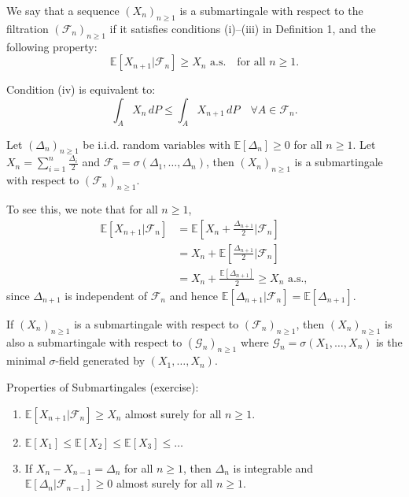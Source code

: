 \begin{definition}
We say that a sequence $(X_n)_{n\geq1}$ is a submartingale with respect to the filtration $(\mathcal{F}_n)_{n\geq1}$ if it satisfies conditions (i)--(iii) in Definition 1, and the following property:
\begin{equation*}
    \mathbb{E}[X_{n+1}|\mathcal{F}_n] \geq X_n \text{ a.s.} \quad \text{for all } n \geq 1.
\end{equation*}
\end{definition}

Condition (iv) is equivalent to:
\begin{equation*}
    \int_A X_n \, dP \leq \int_A X_{n+1} \, dP \quad \forall A \in \mathcal{F}_n.
\end{equation*}


\begin{example}
Let $(\Delta_n)_{n\geq1}$ be i.i.d. random variables with $\mathbb{E}[\Delta_n] \geq 0$ for all $n \geq 1$. Let $X_n = \sum_{i=1}^n \frac{\Delta_i}{2}$ and $\mathcal{F}_n = \sigma(\Delta_1, \ldots, \Delta_n)$, then $(X_n)_{n\geq1}$ is a submartingale with respect to $(\mathcal{F}_n)_{n\geq1}$.

To see this, we note that for all $n \geq 1$,
\begin{align*}
    \mathbb{E}[X_{n+1}|\mathcal{F}_n] &= \mathbb{E}[X_n + \frac{\Delta_{n+1}}{2}|\mathcal{F}_n] \\
    &= X_n + \mathbb{E}[\frac{\Delta_{n+1}}{2}|\mathcal{F}_n] \\
    &= X_n + \frac{\mathbb{E}[\Delta_{n+1}]}{2} \geq X_n \text{ a.s.},
\end{align*}
since $\Delta_{n+1}$ is independent of $\mathcal{F}_n$ and hence $\mathbb{E}[\Delta_{n+1}|\mathcal{F}_n] = \mathbb{E}[\Delta_{n+1}]$.
\end{example}

If $(X_n)_{n \geq 1}$ is a submartingale with respect to $(\mathcal{F}_n)_{n \geq 1}$, then $(X_n)_{n \geq 1}$ is also a submartingale with respect to $(\mathcal{G}_n)_{n \geq 1}$ where $\mathcal{G}_n = \sigma(X_1,\dots,X_n)$ is the minimal $\sigma$-field generated by $(X_1,\dots,X_n)$.

Properties of Submartingales (exercise):
\begin{enumerate}
    \item $\mathbb{E}[X_{n+1} | \mathcal{F}_n] \geq X_n$ almost surely for all $n \geq 1$.
    \item $\mathbb{E}[X_1] \leq \mathbb{E}[X_2] \leq \mathbb{E}[X_3] \leq \dots$
    \item If $X_n - X_{n-1} = \Delta_n$ for all $n \geq 1$, then $\Delta_n$ is integrable and $\mathbb{E}[\Delta_n | \mathcal{F}_{n-1}] \geq 0$ almost surely for all $n \geq 1$.
\end{enumerate}


